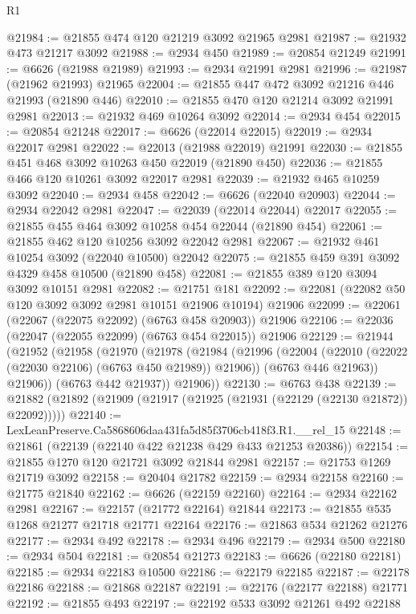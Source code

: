 \begin{lexlean}{R1}
\begin{coremodule}
@21984 := @21855 @474 @120 @21219 @3092 @21965 @2981
@21987 := @21932 @473 @21217 @3092
@21988 := @2934 @450
@21989 := @20854 @21249
@21991 := @6626 (@21988 @21989)
@21993 := @2934 @21991 @2981
@21996 := @21987 (@21962 @21993) @21965
@22004 := @21855 @447 @472 @3092 @21216 @446 @21993 (@21890 @446)
@22010 := @21855 @470 @120 @21214 @3092 @21991 @2981
@22013 := @21932 @469 @10264 @3092
@22014 := @2934 @454
@22015 := @20854 @21248
@22017 := @6626 (@22014 @22015)
@22019 := @2934 @22017 @2981
@22022 := @22013 (@21988 @22019) @21991
@22030 := @21855 @451 @468 @3092 @10263 @450 @22019 (@21890 @450)
@22036 := @21855 @466 @120 @10261 @3092 @22017 @2981
@22039 := @21932 @465 @10259 @3092
@22040 := @2934 @458
@22042 := @6626 (@22040 @20903)
@22044 := @2934 @22042 @2981
@22047 := @22039 (@22014 @22044) @22017
@22055 := @21855 @455 @464 @3092 @10258 @454 @22044 (@21890 @454)
@22061 := @21855 @462 @120 @10256 @3092 @22042 @2981
@22067 := @21932 @461 @10254 @3092 (@22040 @10500) @22042
@22075 := @21855 @459 @391 @3092 @4329 @458 @10500 (@21890 @458)
@22081 := @21855 @389 @120 @3094 @3092 @10151 @2981
@22082 := @21751 @181
@22092 := @22081 (@22082 @50 @120 @3092 @3092 @2981 @10151 @21906 @10194) @21906
@22099 := @22061 (@22067 (@22075 @22092) (@6763 @458 @20903)) @21906
@22106 := @22036 (@22047 (@22055 @22099) (@6763 @454 @22015)) @21906
@22129 := @21944
    (@21952
      (@21958
        (@21970
          (@21978
            (@21984
              (@21996
                (@22004 (@22010 (@22022 (@22030 @22106) (@6763 @450 @21989)) @21906))
                (@6763 @446 @21963))
              @21906))
          (@6763 @442 @21937))
        @21906))
@22130 := @6763 @438
@22139 := @21882 (@21892 (@21909 (@21917 (@21925 (@21931 (@22129 (@22130 @21872)) @22092)))))
@22140 := LexLeanPreserve.Ca5868606daa431fa5d85f3706cb418f3.R1.__rel_15
@22148 := @21861 (@22139 (@22140 @422 @21238 @429 @433 @21253 @20386))
@22154 := @21855 @1270 @120 @21721 @3092 @21844 @2981
@22157 := @21753 @1269 @21719 @3092
@22158 := @20404 @21782
@22159 := @2934 @22158
@22160 := @21775 @21840
@22162 := @6626 (@22159 @22160)
@22164 := @2934 @22162 @2981
@22167 := @22157 (@21772 @22164) @21844
@22173 := @21855 @535 @1268 @21277 @21718 @21771 @22164
@22176 := @21863 @534 @21262 @21276
@22177 := @2934 @492
@22178 := @2934 @496
@22179 := @2934 @500
@22180 := @2934 @504
@22181 := @20854 @21273
@22183 := @6626 (@22180 @22181)
@22185 := @2934 @22183 @10500
@22186 := @22179 @22185
@22187 := @22178 @22186
@22188 := @21868 @22187
@22191 := @22176 (@22177 @22188) @21771
@22192 := @21855 @493
@22197 := @22192 @533 @3092 @21261 @492 @22188

\end{coremodule}
\end{lexlean}
